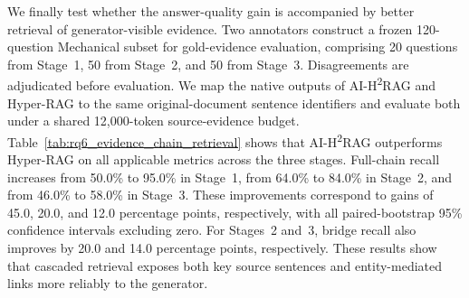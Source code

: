 \documentclass{article} %
\begin{document}
We finally test whether the answer-quality gain is accompanied by better retrieval of generator-visible evidence. Two annotators construct a frozen 120-question Mechanical subset for gold-evidence evaluation, comprising 20 questions from Stage~1, 50 from Stage~2, and 50 from Stage~3. Disagreements are adjudicated before evaluation. We map the native outputs of AI-H\textsuperscript{2}RAG and Hyper-RAG to the same original-document sentence identifiers and evaluate both under a shared 12,000-token source-evidence budget. Table~\ref{tab:rq6_evidence_chain_retrieval} shows that AI-H\textsuperscript{2}RAG outperforms Hyper-RAG on all applicable metrics across the three stages. Full-chain recall increases from 50.0\% to 95.0\% in Stage~1, from 64.0\% to 84.0\% in Stage~2, and from 46.0\% to 58.0\% in Stage~3. These improvements correspond to gains of 45.0, 20.0, and 12.0 percentage points, respectively, with all paired-bootstrap 95\% confidence intervals excluding zero. For Stages~2 and~3, bridge recall also improves by 20.0 and 14.0 percentage points, respectively. These results show that cascaded retrieval exposes both key source sentences and entity-mediated links more reliably to the generator.
\end{document}
